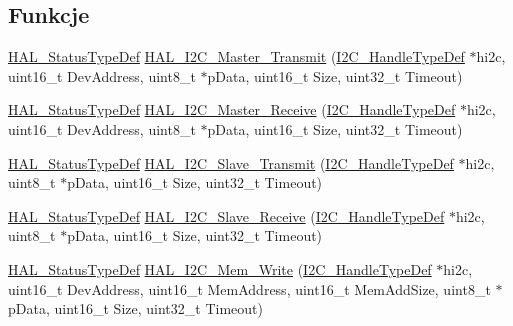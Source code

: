 \subsection*{Funkcje}
\begin{DoxyCompactItemize}
\item 
\hyperlink{stm32f4xx__hal__def_8h_a63c0679d1cb8b8c684fbb0632743478f}{H\+A\+L\+\_\+\+Status\+Type\+Def} \hyperlink{group___i2_c___exported___functions___group2_ga9440a306e25c7bd038cfa8619ec9a830}{H\+A\+L\+\_\+\+I2\+C\+\_\+\+Master\+\_\+\+Transmit} (\hyperlink{group___i2_c__handle___structure__definition_ga68e9f45c2fd2161fb827ccdeabb55ea5}{I2\+C\+\_\+\+Handle\+Type\+Def} $\ast$hi2c, uint16\+\_\+t Dev\+Address, uint8\+\_\+t $\ast$p\+Data, uint16\+\_\+t Size, uint32\+\_\+t Timeout)
\item 
\hyperlink{stm32f4xx__hal__def_8h_a63c0679d1cb8b8c684fbb0632743478f}{H\+A\+L\+\_\+\+Status\+Type\+Def} \hyperlink{group___i2_c___exported___functions___group2_ga6b3cef8c309e88ed6d3b8deba149aac9}{H\+A\+L\+\_\+\+I2\+C\+\_\+\+Master\+\_\+\+Receive} (\hyperlink{group___i2_c__handle___structure__definition_ga68e9f45c2fd2161fb827ccdeabb55ea5}{I2\+C\+\_\+\+Handle\+Type\+Def} $\ast$hi2c, uint16\+\_\+t Dev\+Address, uint8\+\_\+t $\ast$p\+Data, uint16\+\_\+t Size, uint32\+\_\+t Timeout)
\item 
\hyperlink{stm32f4xx__hal__def_8h_a63c0679d1cb8b8c684fbb0632743478f}{H\+A\+L\+\_\+\+Status\+Type\+Def} \hyperlink{group___i2_c___exported___functions___group2_ga9128c5f01406d0da061a2bce00b6866e}{H\+A\+L\+\_\+\+I2\+C\+\_\+\+Slave\+\_\+\+Transmit} (\hyperlink{group___i2_c__handle___structure__definition_ga68e9f45c2fd2161fb827ccdeabb55ea5}{I2\+C\+\_\+\+Handle\+Type\+Def} $\ast$hi2c, uint8\+\_\+t $\ast$p\+Data, uint16\+\_\+t Size, uint32\+\_\+t Timeout)
\item 
\hyperlink{stm32f4xx__hal__def_8h_a63c0679d1cb8b8c684fbb0632743478f}{H\+A\+L\+\_\+\+Status\+Type\+Def} \hyperlink{group___i2_c___exported___functions___group2_ga92b445a5ca4f5b8195f1c10ebdc41687}{H\+A\+L\+\_\+\+I2\+C\+\_\+\+Slave\+\_\+\+Receive} (\hyperlink{group___i2_c__handle___structure__definition_ga68e9f45c2fd2161fb827ccdeabb55ea5}{I2\+C\+\_\+\+Handle\+Type\+Def} $\ast$hi2c, uint8\+\_\+t $\ast$p\+Data, uint16\+\_\+t Size, uint32\+\_\+t Timeout)
\item 
\hyperlink{stm32f4xx__hal__def_8h_a63c0679d1cb8b8c684fbb0632743478f}{H\+A\+L\+\_\+\+Status\+Type\+Def} \hyperlink{group___i2_c___exported___functions___group2_ga33e725a824eb672f9f999d9d5ce088fb}{H\+A\+L\+\_\+\+I2\+C\+\_\+\+Mem\+\_\+\+Write} (\hyperlink{group___i2_c__handle___structure__definition_ga68e9f45c2fd2161fb827ccdeabb55ea5}{I2\+C\+\_\+\+Handle\+Type\+Def} $\ast$hi2c, uint16\+\_\+t Dev\+Address, uint16\+\_\+t Mem\+Address, uint16\+\_\+t Mem\+Add\+Size, uint8\+\_\+t $\ast$p\+Data, uint16\+\_\+t Size, uint32\+\_\+t Timeout)

\end{DoxyCompactItemize}
